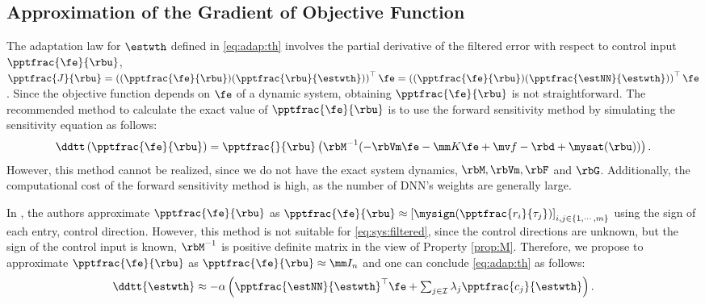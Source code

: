 \documentclass[lettersize,journal]{IEEEtran}
\begin{document}
\subsection{Approximation of the Gradient of Objective Function}

The adaptation law for $\estwth$ defined in \eqref{eq:adap:th} involves the partial derivative of the filtered error with respect to control input $\pptfrac{\fe}{\rbu}$, \ie 
$
    \pptfrac{J}{\rbu}
    =
    \left(
        (\pptfrac{\fe}{\rbu})
        (\pptfrac{\rbu}{\estwth})
    \right)
    ^\top \fe
    =
    \left(
        (\pptfrac{\fe}{\rbu})
        (\pptfrac{\estNN}{\estwth})
    \right)
    ^\top \fe
$. 
Since the objective function depends on $\fe$ of a dynamic system, obtaining $\pptfrac{\fe}{\rbu}$ is not straightforward. 
The recommended method to calculate the exact value of $\pptfrac{\fe}{\rbu}$ is to use the forward sensitivity method \cite{Sengupta:2014aa} by simulating the sensitivity equation as follows: 
\begin{equation}
    \ddtt 
    \left(
        \pptfrac{\fe}{\rbu}
    \right)
    =
    \pptfrac{}{
        \rbu
    }
    \left(
        \rbM^{-1}(
            -\rbVm \fe
            -\mm K \fe
            + \mv f
            -\rbd + \mysat(\rbu)
        )
    \right)
    .
\end{equation}
However, this method cannot be realized, since we do not have the exact system dynamics, \ie $\rbM,\rbVm, \rbF$ and $ \rbG$.
Additionally, the computational cost of the forward sensitivity method is high, as the number of DNN's weights are generally large.

In \cite{Douratsos:2007aa,Saerens:1991aa}, the authors approximate $\pptfrac{\fe}{\rbu}$ as $
    \pptfrac{\fe}{\rbu}
    \approx
    \left[
        \mysign(\pptfrac{r_i}{\tau_j})
    \right]_{i,j\in\{1,\cdots,m\}}
$ using the sign of each entry, \ie control direction.
However, this method is not suitable for \eqref{eq:sys:filtered}, since the control directions are unknown, but the sign of the control input is known, \ie $\rbM^{-1}$ is positive definite matrix in the view of Property \ref{prop:M}.
Therefore, we propose to approximate $\pptfrac{\fe}{\rbu}$ as $\pptfrac{\fe}{\rbu}\approx \mm I_n$ and one can conclude \eqref{eq:adap:th} as follows:
\begin{equation}
    \ddtt{\estwth}
    \approx
    -\alpha 
    \left(
        \pptfrac{\estNN}
        {\estwth}^\top
        \fe
        +
        \textstyle\sum_{j\in\mathcal{I}}
        \lambda_j 
        \pptfrac{c_j}{\estwth}
    \right)
    .
    \label{eq:adap:th:approx}
\end{equation}
\end{document}
